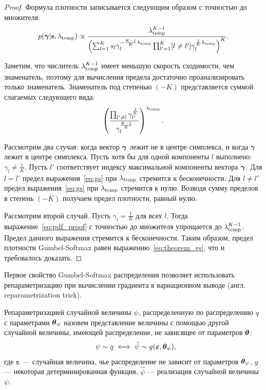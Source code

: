 \begin{proof} 
Формула плотности записывается следующим образом с точностью до множителя:
\begin{equation}
\label{eq:pdf_proof}
    p(\boldsymbol{\gamma}|\mathbf{s}, \lambda_{\text{temp}}) \propto    \frac{\lambda_{\text{temp}}^{K-1}}{\left(\sum_{l=1}^K s_l\gamma_l^{-\frac{K-1}{K}\lambda_{\text{temp}}}\prod_{l'=1}^K [l \neq l']\gamma_l^{\frac{1}{K}\lambda_{\text{temp}}}\right)^{K}}.
\end{equation}

Заметим, что числитель $\lambda_{\text{temp}}^{K-1}$ имеет меньшую скорость сходимости, чем знаменатель, поэтому для вычисления предела достаточно проанализировать только знаменатель. Знаменатель под степенью $(-K)$ представляется суммой слагаемых следующего вида: 
\begin{equation}
\label{eq:gs}
    \left(\frac{\prod_{l' \neq l} \gamma_{l'}^{\frac{1}{K}}}{\gamma_l^{\frac{K-1}{K}}}\right)^{\lambda_{\text{temp}}}.
\end{equation}

Рассмотрим два случая: когда вектор $\boldsymbol{\gamma}$  лежит не в центре симплекса, и когда  $\boldsymbol{\gamma}$ лежит в центре симплекса. 
Пусть хотя бы для одной компоненты $l$ выполнено: $\gamma_l \neq \frac{1}{K}$. Пусть $l'$ соответствует индексу максимальной компоненты вектора $\boldsymbol{\gamma}$.
Для $l=l'$ предел выражения~\eqref{eq:gs} при $\lambda_{\text{temp}}$ стремится к бесконечности. Для $l\neq l'$ предел выражения~\eqref{eq:gs} при $\lambda_{\text{temp}}$ стремится к нулю. Возводя сумму пределов в степень $(-K)$ получаем предел плотности, равный нулю.

Рассмотрим второй случай. Пусть ${\gamma}_l = \frac{1}{K}$ для всех $l$.
Тогда выражение~\eqref{eq:pdf_proof} с точностью до множителя упрощается до $\lambda_{\text{temp}}^{K-1}$. Предел данного выражения стремится к бесконечности.
Таким образом, предел плотности Gumbel-Softmax равен выражению~\eqref{eq:theorem_gs}, что и требовалось доказать.

\end{proof}


Первое свойство Gumbel-Softmax распределения позволяет использовать репараметризацию при вычислении градиента в вариационном выводе (англ. reparametrization trick). 
\begin{defin} Репараметризацией случайной величины $\psi$, распределенную по распределению $q$ с параметрами $\boldsymbol{\theta}_\psi$ назовем представление величины с помощью другой случайной величины, имеющей  распределение, не зависящее от параметров $\boldsymbol{\theta}$:
\[
    \psi \sim q \iff \hat{\psi} \sim g(\boldsymbol{\varepsilon},\teta_\psi),
\]
где $\boldsymbol{\varepsilon}$ --- случайная величина, чье распределение не зависит от параметров $\boldsymbol{\theta}_\psi$, $g$ --- некоторая детерминированная функция, $\hat{\psi}$ --- реализация случайной величины $\psi$.
\end{defin}

